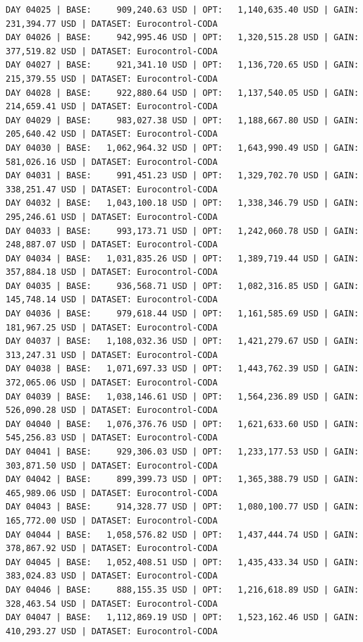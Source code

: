 \documentclass[11pt,a4paper]{article}
\begin{document}
\begin{verbatim}
DAY 04025 | BASE:     909,240.63 USD | OPT:   1,140,635.40 USD | GAIN: 231,394.77 USD | DATASET: Eurocontrol-CODA
DAY 04026 | BASE:     942,995.46 USD | OPT:   1,320,515.28 USD | GAIN: 377,519.82 USD | DATASET: Eurocontrol-CODA
DAY 04027 | BASE:     921,341.10 USD | OPT:   1,136,720.65 USD | GAIN: 215,379.55 USD | DATASET: Eurocontrol-CODA
DAY 04028 | BASE:     922,880.64 USD | OPT:   1,137,540.05 USD | GAIN: 214,659.41 USD | DATASET: Eurocontrol-CODA
DAY 04029 | BASE:     983,027.38 USD | OPT:   1,188,667.80 USD | GAIN: 205,640.42 USD | DATASET: Eurocontrol-CODA
DAY 04030 | BASE:   1,062,964.32 USD | OPT:   1,643,990.49 USD | GAIN: 581,026.16 USD | DATASET: Eurocontrol-CODA
DAY 04031 | BASE:     991,451.23 USD | OPT:   1,329,702.70 USD | GAIN: 338,251.47 USD | DATASET: Eurocontrol-CODA
DAY 04032 | BASE:   1,043,100.18 USD | OPT:   1,338,346.79 USD | GAIN: 295,246.61 USD | DATASET: Eurocontrol-CODA
DAY 04033 | BASE:     993,173.71 USD | OPT:   1,242,060.78 USD | GAIN: 248,887.07 USD | DATASET: Eurocontrol-CODA
DAY 04034 | BASE:   1,031,835.26 USD | OPT:   1,389,719.44 USD | GAIN: 357,884.18 USD | DATASET: Eurocontrol-CODA
DAY 04035 | BASE:     936,568.71 USD | OPT:   1,082,316.85 USD | GAIN: 145,748.14 USD | DATASET: Eurocontrol-CODA
DAY 04036 | BASE:     979,618.44 USD | OPT:   1,161,585.69 USD | GAIN: 181,967.25 USD | DATASET: Eurocontrol-CODA
DAY 04037 | BASE:   1,108,032.36 USD | OPT:   1,421,279.67 USD | GAIN: 313,247.31 USD | DATASET: Eurocontrol-CODA
DAY 04038 | BASE:   1,071,697.33 USD | OPT:   1,443,762.39 USD | GAIN: 372,065.06 USD | DATASET: Eurocontrol-CODA
DAY 04039 | BASE:   1,038,146.61 USD | OPT:   1,564,236.89 USD | GAIN: 526,090.28 USD | DATASET: Eurocontrol-CODA
DAY 04040 | BASE:   1,076,376.76 USD | OPT:   1,621,633.60 USD | GAIN: 545,256.83 USD | DATASET: Eurocontrol-CODA
DAY 04041 | BASE:     929,306.03 USD | OPT:   1,233,177.53 USD | GAIN: 303,871.50 USD | DATASET: Eurocontrol-CODA
DAY 04042 | BASE:     899,399.73 USD | OPT:   1,365,388.79 USD | GAIN: 465,989.06 USD | DATASET: Eurocontrol-CODA
DAY 04043 | BASE:     914,328.77 USD | OPT:   1,080,100.77 USD | GAIN: 165,772.00 USD | DATASET: Eurocontrol-CODA
DAY 04044 | BASE:   1,058,576.82 USD | OPT:   1,437,444.74 USD | GAIN: 378,867.92 USD | DATASET: Eurocontrol-CODA
DAY 04045 | BASE:   1,052,408.51 USD | OPT:   1,435,433.34 USD | GAIN: 383,024.83 USD | DATASET: Eurocontrol-CODA
DAY 04046 | BASE:     888,155.35 USD | OPT:   1,216,618.89 USD | GAIN: 328,463.54 USD | DATASET: Eurocontrol-CODA
DAY 04047 | BASE:   1,112,869.19 USD | OPT:   1,523,162.46 USD | GAIN: 410,293.27 USD | DATASET: Eurocontrol-CODA

\end{verbatim}
\end{document}
